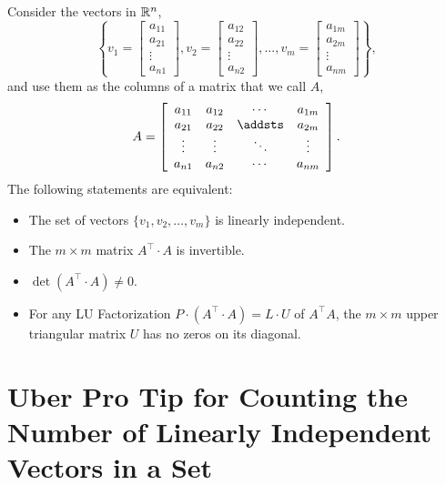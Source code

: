 \documentclass[letterpaper]{book}
\begin{document}
\begin{tcolorbox}[sharp corners, colback=green!30, colframe=green!80!blue,
title=\textbf{Pro-tip! Linear Independence in a Nutshell}]
Consider the vectors in $\mathbb R^n$,
$$\left\{v_1=\begin{bmatrix} a_{11} \\ a_{21}\\ \vdots \\ a_{n1} \end{bmatrix},  v_2=\begin{bmatrix} a_{12} \\ a_{22}\\ \vdots \\ a_{n2} \end{bmatrix}, ...,  v_m=\begin{bmatrix} a_{1m} \\ a_{2m}\\ \vdots \\ a_{nm} \end{bmatrix} \right\},$$ 
and use them as the columns of a matrix that we call $A$,
\begin{equation}
\label{eq:MatrixFromLinearIndependence_proTipC}    
A=\left[\begin{array}{cccc} a_{11}& a_{12}& \cdots & a_{1m} \\
 a_{21}& a_{22}& \addsts & a_{2m}  \\
 \vdots & \vdots&  \ddots & \vdots \\
 a_{n1}& a_{n2}& \cdots & a_{nm} 
 \end{array}\right].
 \end{equation}
 The following statements are equivalent:
 \begin{itemize}
     \item  The set of vectors $ \{v_1, v_2, \ldots, v_m \} $ is linearly independent.
     \item The $m \times m$ matrix $A^\top \cdot A$ is invertible. 
     \item $\det(A^\top \cdot A) \neq 0$.
     \item For any LU Factorization $P \cdot (A^\top \cdot A) = L \cdot U$  of $A^\top A$, the $m \times m$ upper triangular matrix $U$ has no zeros on its diagonal.
 \end{itemize}
 \end{tcolorbox}

\vspace*{.3cm}


\section{Uber Pro Tip for Counting the Number of Linearly Independent Vectors in a Set}
\end{document}
